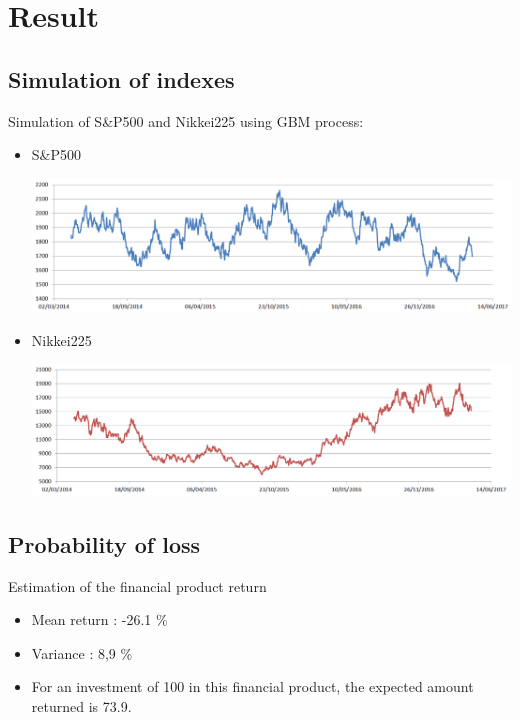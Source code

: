 \section{Result}

\subsection{Simulation of indexes}
\begin{frame}
\myframetitle{}
Simulation of S\&P500 and Nikkei225 using GBM process:
\begin{itemize}
	\item S\&P500 \\
	\begin{center}
	\vspace{0.3cm}
	\includegraphics[width=0.7\linewidth]{../Report/SandP500_simulated}
	\end{center}
	\item Nikkei225 \\
	\begin{center}
	\vspace{0.3cm}
	\includegraphics[width=0.7\linewidth]{../Report/Nikkei225_simulated}
	\end{center}
\end{itemize}
\end{frame}

\subsection{Probability of loss}
\begin{frame}[c]
\myframetitle{}
Estimation of the financial product return
\begin{itemize}
	\item Mean return : -26.1 \%
	\item Variance :  8,9 \%
\end{itemize}

\vspace{1cm}

\begin{itemize}
\item For an investment of 100 in this financial product, the expected amount returned is 73.9.
\end{itemize}

\end{frame}

